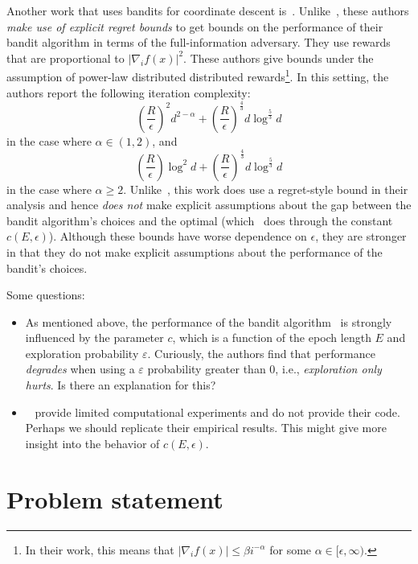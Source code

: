 \documentclass[letterpaper]{article}
\begin{document}
Another work that uses bandits for coordinate descent is~\cite{namkoong2017adaptive}. Unlike~\cite{salehi2018coordinate}, these authors \emph{make use of explicit regret bounds} to get bounds on the performance of their bandit algorithm in terms of the full-information adversary. They use rewards that are proportional to $|\nabla_i f(x)|^2$. These authors give bounds under the assumption of power-law distributed distributed rewards\footnote{In their work, this means that $|\nabla_i f(x)| \leq \beta i^{-\alpha}$ for some $\alpha \in [\epsilon, \infty)$.}. In this setting, the authors report the following iteration complexity:
\begin{equation}
    \left(\frac{R}{\epsilon}\right)^2 d^{2-\alpha} + \left(\frac{R}{\epsilon}\right)^\frac{4}{3} d \log^\frac{5}{3} d
\end{equation}
in the case where $\alpha \in (1,2)$, and
\begin{equation}
    \left(\frac{R}{\epsilon}\right) \log^2 d + \left(\frac{R}{\epsilon}\right)^\frac{4}{3} d \log^\frac{5}{3} d
\end{equation}
in the case where $\alpha \geq 2$. Unlike~\cite{salehi2018coordinate}, this work does use a regret-style bound in their analysis and hence \emph{does not} make explicit assumptions about the gap between the bandit algorithm's choices and the optimal (which~\cite{salehi2018coordinate} does through the constant $c(E, \epsilon)$). Although these bounds have worse dependence on $\epsilon$, they are stronger in that they do not make explicit assumptions about the performance of the bandit's choices.

Some questions:
\begin{itemize}
    \item As mentioned above, the performance of the bandit algorithm~\cite{salehi2018coordinate} is strongly influenced by the parameter $c$, which is a function of the epoch length $E$ and exploration probability $\varepsilon$. Curiously, the authors find that performance \emph{degrades} when using a $\varepsilon$ probability greater than 0, i.e., \emph{exploration only hurts}. Is there an explanation for this?
    \item ~\cite{salehi2018coordinate} provide limited computational experiments and do not provide their code. Perhaps we should replicate their empirical results. This might give more insight into the behavior of $c(E, \epsilon)$.
\end{itemize}


\section{Problem statement}
\end{document}

